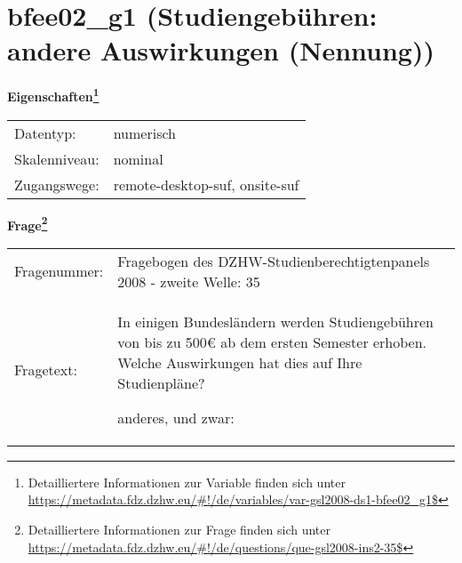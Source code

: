 
    \setcounter{footnote}{0}

    \vspace*{-1.8cm}
	\section{bfee02\_g1 (Studiengebühren: andere Auswirkungen (Nennung))}
	\label{section:bfee02_g1}



    \vspace*{0.5cm}
    \noindent\textbf{Eigenschaften\footnote{Detailliertere Informationen zur Variable finden sich unter
		\url{https://metadata.fdz.dzhw.eu/\#!/de/variables/var-gsl2008-ds1-bfee02_g1$}}}\\
	\begin{tabularx}{\hsize}{@{}lX}
	Datentyp: & numerisch \\
	Skalenniveau: & nominal \\
	Zugangswege: &
	  remote-desktop-suf, 
	  onsite-suf
 \\
    \end{tabularx}



				\vspace*{0.5cm}
                \noindent\textbf{Frage\footnote{Detailliertere Informationen zur Frage finden sich unter
		              \url{https://metadata.fdz.dzhw.eu/\#!/de/questions/que-gsl2008-ins2-35$}}}\\
				\begin{tabularx}{\hsize}{@{}lX}
					Fragenummer: &
					  Fragebogen des DZHW-Studienberechtigtenpanels 2008 - zweite Welle:
					  35
 \\
					Fragetext: & In einigen Bundesländern werden Studiengebühren von bis zu 500€ ab dem ersten Semester erhoben. Welche Auswirkungen hat dies auf Ihre Studienpläne?\par  anderes, und zwar: \\
				\end{tabularx}





